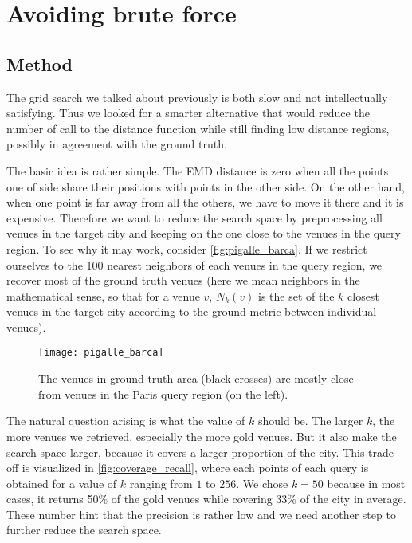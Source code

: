 \chapter{Avoiding brute force}
\label{chap:approx}

\section{Method}

The grid search we talked about previously is both slow and not intellectually satisfying. Thus we looked for a smarter alternative that would reduce the number of call to the distance function while still finding low distance regions, possibly in agreement with the ground truth.

The basic idea is rather simple. The EMD distance is zero when all the points one of side share their positions with points in the other side. On the other hand, when one point is far away from all the others, we have to move it there and it is expensive. Therefore we want to reduce the search space by preprocessing all venues in the target city and keeping on the one close to the venues in the query region. To see why it may work, consider \autoref{fig:pigalle_barca}. If we restrict ourselves to the 100 nearest neighbors of each venues in the query region, we recover most of the ground truth venues (here we mean neighbors in the mathematical sense, so that for a venue $v$, $N_k(v)$ is the set of the $k$ closest venues in the target city according to the ground metric between individual venues).

\begin{figure}[b]
    \centering
    \texttt{[image: pigalle\_barca]}
    \caption{The venues in ground truth area (black crosses) are mostly close from venues in the Paris query region (on the left).}
    \label{fig:pigalle_barca}
\end{figure}

The natural question arising is what the value of $k$ should be. The larger $k$, the more venues we retrieved, especially the more gold venues. But it also make the search space larger, because it covers a larger proportion of the city. This trade off is visualized in \autoref{fig:coverage_recall}, where each points of each query is obtained for a value of $k$ ranging from $1$ to $256$. We chose $k=50$ because in most cases, it returns 50\% of the gold venues while covering 33\% of the city in average. These number hint that the precision is rather low and we need another step to further reduce the search space.

